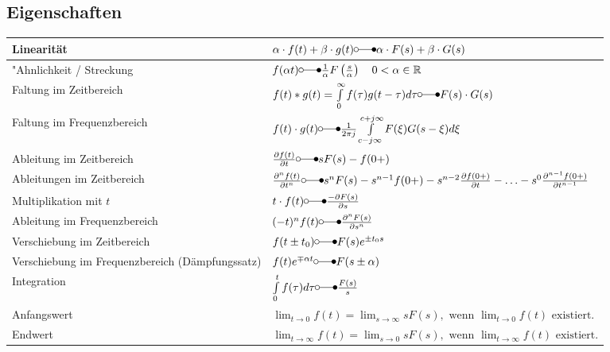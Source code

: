  	\subsection{Eigenschaften}
  		\renewcommand{\arraystretch}{2}
		\begin{tabular}{|l|l|}
        	\hline
        	Linearität & 
 			$\alpha\cdot f(t) + \beta\cdot g(t) \laplace \alpha\cdot F(s) + \beta\cdot
 			G(s)$ \\
 			\hline
 			"Ahnlichkeit / Streckung &
 			$f(\alpha t) \laplace \frac{1}{\alpha}F \left (\frac{s}{\alpha} \right ) \quad 0
 			<\alpha \in\mathbb{R}$ \\
 			\hline
 			Faltung im Zeitbereich &
 			$f(t) \ast g(t) = \int\limits_{0}^{\infty} f(\tau)g(t-\tau)d\tau \laplace F(s)
 			\cdot G(s)$\\
 			\hline
 			Faltung im Frequenzbereich &
 			$f(t) \cdot g(t) \laplace \frac{1}{2\pi j}\int\limits_{c-j\infty}^{c+j\infty}
 			F(\xi) G(s-\xi)d\xi$ \\
 			\hline
 			Ableitung im Zeitbereich &
 			$\frac{\partial f(t)}{\partial t} \laplace sF(s)
 			-f(0+)$ \\
 			\hline
 			Ableitungen im Zeitbereich &
 			$\frac{\partial^n f(t)}{\partial t^n} \laplace s^nF(s)
 			-s^{n-1}f(0+)-s^{n-2}\frac{\partial f(0+)}{\partial t}-\ldots
 			-s^0\frac{\partial^{n-1} f(0+)}{\partial t^{n-1}}$ \\
 			\hline
 			Multiplikation mit $t$ &
 			$t\cdot f(t)  \laplace \frac{-\partial F(s)}{\partial s}$ \\
 			\hline
 			Ableitung im Frequenzbereich &
 			$(-t)^n f(t) \laplace  \frac{\partial^n F(s)}{\partial s^n}$ \\
 			\hline
 			Verschiebung im Zeitbereich &
 			$f(t\pm t_0) \laplace F(s)e^{\pm t_0 s}$ \\
 			\hline
 			Verschiebung im Frequenzbereich (Dämpfungssatz) &
 			$f(t)e^{\mp\alpha t} \laplace F(s\pm\alpha)$ \\
 			\hline
 			Integration &
 			$\int\limits_0^t f(\tau)d\tau \laplace \frac{F(s)}{s}$ \\
 			\hline
 			Anfangswert &
 			$\lim_{t\rightarrow 0} f(t) = \lim_{s\rightarrow \infty} sF(s),\text{~wenn
 			}  \lim_{t\rightarrow 0} f(t)\text{~existiert}.$ \\
 			\hline
 			Endwert &
 			$\lim_{t\rightarrow \infty} f(t) = \lim_{s\rightarrow 0} sF(s),\text{~wenn
 			}  \lim_{t\rightarrow \infty} f(t)\text{~existiert}.$ \\
 			\hline
       	\end{tabular}
		\renewcommand{\arraystretch}{\arraystretchOriginal}
	
